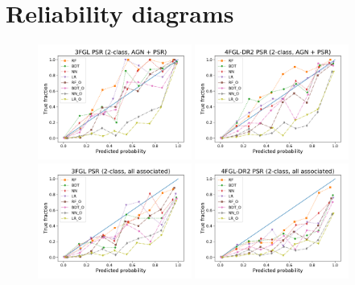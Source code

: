 \section{Reliability diagrams}


\begin{figure}[ht]
\centering
\hspace*{-0.5cm}
\includegraphics[width=0.45\textwidth]{plots/reliability/calibration_PSR_3FGL_2classes_AGN_PSR.pdf}
\includegraphics[width=0.45\textwidth]{plots/reliability/calibration_PSR_4FGL-DR2_2classes_AGN_PSR.pdf} \\ 
\includegraphics[width=0.45\textwidth]{plots/reliability/calibration_PSR_3FGL_2classes_all_assoc.pdf}
\includegraphics[width=0.45\textwidth]{plots/reliability/calibration_PSR_4FGL-DR2_2classes_all_assoc.pdf} \\ 

\end{figure}
